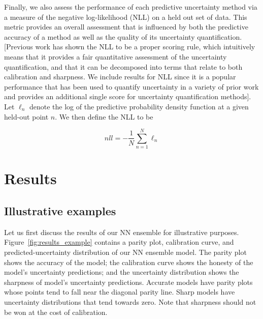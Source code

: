 \documentclass[]{achemso}
\begin{document}
Finally, we also assess the performance of each predictive uncertainty method
via a measure of the negative log-likelihood (NLL) on a held out set of data.
This metric provides an overall assessment that is influenced by both the
predictive accuracy of a method as well as the quality of its uncertainty
quantification.
[Previous work \cite{} has shown the NLL to be a proper scoring rule, which
intuitively means that it provides a fair quantitative assessment of the
uncertainty quantification, and that it can be decomposed into terms that
relate to both calibration and sharpness. We include results for NLL since it
is a popular performance that has been used to quantify uncertainty in a
variety of prior work \cite{} and provides an additional single score for
uncertainty quantification methods].
Let $\ell_n$ denote the log of the predictive probability density function at a
given held-out point $n$. We then define the NLL to be

\begin{equation} \label{nll}
  nll = - \frac{1}{N} \sum_{n=1}^{N} \ell_n
\end{equation}



\section{Results}

\subsection{Illustrative examples}

Let us first discuss the results of our \gls{NN} ensemble for illustrative purposes.
Figure~\ref{fig:results_example} contains a parity plot, calibration curve, and predicted-uncertainty distribution of our \gls{NN} ensemble model.
The parity plot shows the accuracy of the model; the calibration curve shows the honesty of the model's uncertainty predictions; and the uncertainty distribution shows the sharpness of model's uncertainty predictions.
Accurate models have parity plots whose points tend to fall near the diagonal parity line.
Sharp models have uncertainty distributions that tend towards zero.
Note that sharpness should not be won at the cost of calibration.
\end{document}
